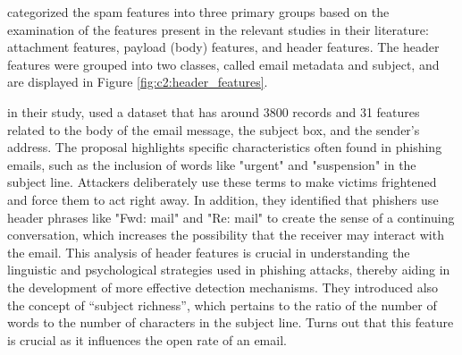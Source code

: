 
\citet{8257764} categorized the spam features into three primary groups based on the examination of the features present in the relevant studies in their literature: attachment features, payload (body) features, and header features. The header features were grouped into two classes, called email metadata and subject, and are displayed in Figure \ref{fig:c2:header_features}.



\citet{Abadla202312} in their study, used a dataset that has around 3800 records and 31 features related to the body of the email message, the subject box, and the sender’s address.
The proposal highlights specific characteristics often found in phishing emails, such as the inclusion of words like "urgent" and "suspension" in the subject line. Attackers deliberately use these terms to make victims frightened and force them to act right away. In addition, they identified that phishers use header phrases like "Fwd: mail" and "Re: mail" to create the sense of a continuing conversation, which increases the possibility that the receiver may interact with the email. This analysis of header features is crucial in understanding the linguistic and psychological strategies used in phishing attacks, thereby aiding in the development of more effective detection mechanisms. They introduced also the concept of “subject richness”, which pertains to the ratio of the number of words to the number of characters in the subject line. Turns out that this feature is crucial as it influences the open rate of an email.


\begin{comment}
The first step is to understand why people fall for phishing. Something in phishing emails lures the victims into clicking on some malicious link or providing confidential information.~\citet{butavicius2022people} performed a study where the objective was to understand why that happens. For that, they conducted an online experiment, and participants underwent an email classification task designed to examine susceptibility to phishing. In the study's discussion, it was mentioned that participants phishing email detection skills were poor. They correctly identified phishing only 42\% of the time and incorrectly flagged emails that were legitimate 31\% of the time. Despite the emails having leakage cues such as poor grammar, spelling, and punctuation the majority still fell for the attack and clicked the fake malicious link provided. 
\end{comment}


